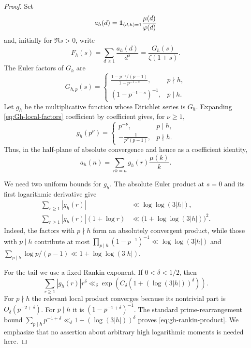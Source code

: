 \begin{proof}
Set
\[
 a_h(d)=\mathbf 1_{(d,h)=1}\frac{\mu(d)}{\varphi(d)}
\]
and, initially for $\Re s>0$, write
\begin{equation}\label{eq:Fh-factorization}
 F_h(s)=\sum_{d\ge1}\frac{a_h(d)}{d^s}
 =\frac{G_h(s)}{\zeta(1+s)}.
\end{equation}
The Euler factors of $G_h$ are
\begin{equation}\label{eq:Gh-local-factors}
 G_{h,p}(s)=
 \begin{cases}
 \displaystyle
 \frac{1-p^{-s}/(p-1)}{1-p^{-1-s}},&p\nmid h,\\[1.2ex]
 (1-p^{-1-s})^{-1},&p\mid h.
 \end{cases}
\end{equation}
Let $g_h$ be the multiplicative function whose Dirichlet series is $G_h$.
Expanding \eqref{eq:Gh-local-factors} coefficient by coefficient gives, for
$\nu\ge1$,
\begin{equation}\label{eq:gh-prime-powers}
 g_h(p^\nu)=
 \begin{cases}
 p^{-\nu},&p\mid h,\\[0.6ex]
 \displaystyle-\frac1{p^\nu(p-1)},&p\nmid h.
 \end{cases}
\end{equation}
Thus, in the half-plane of absolute convergence and hence as a coefficient
identity,
\begin{equation}\label{eq:uniform-coefficient-convolution}
 a_h(n)=\sum_{rk=n}g_h(r)\frac{\mu(k)}k.
\end{equation}

We need two uniform bounds for $g_h$.  The absolute Euler product at $s=0$
and its first logarithmic derivative give
\begin{align}
 \sum_{r\ge1}|g_h(r)|
 &\ll \log\log(3|h|),
 \label{eq:gh-zero-moment}\\
 \sum_{r\ge1}|g_h(r)|(1+\log r)
 &\ll \bigl(1+\log\log(3|h|)\bigr)^2.
 \label{eq:gh-first-log-moment}
\end{align}
Indeed, the factors with $p\nmid h$ form an absolutely convergent product,
while those with $p\mid h$ contribute at most
$\prod_{p\mid h}(1-p^{-1})^{-1}\ll\log\log(3|h|)$ and
$\sum_{p\mid h}\log p/(p-1)\ll1+\log\log(3|h|)$.

For the tail we use a fixed Rankin exponent.  If $0<\delta<1/2$, then
\begin{equation}\label{eq:gh-rankin-product}
 \sum_{r\ge1}|g_h(r)|r^\delta
 \ll_\delta
 \exp\!\left(C_\delta(1+(\log(3|h|))^\delta)\right).
\end{equation}
For $p\nmid h$ the relevant local product converges because its nontrivial
part is $O_\delta(p^{-2+\delta})$.  For $p\mid h$ it is
$(1-p^{-1+\delta})^{-1}$.  The standard prime-rearrangement bound
$\sum_{p\mid h}p^{-1+\delta}\ll_\delta
1+(\log(3|h|))^\delta$ proves \eqref{eq:gh-rankin-product}.  We emphasize
that no assertion about arbitrary high logarithmic moments is needed here.


\end{proof}

